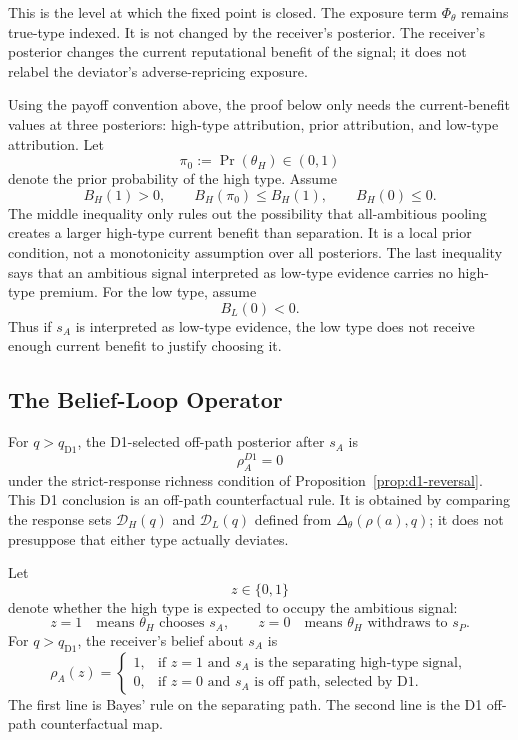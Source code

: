 This is the level at which the fixed point is closed. The exposure term \(\Phi_\theta\) remains true-type indexed. It is not changed by the receiver's posterior. The receiver's posterior changes the current reputational benefit of the signal; it does not relabel the deviator's adverse-repricing exposure.

Using the payoff convention above, the proof below only needs the current-benefit values at three posteriors: high-type attribution, prior attribution, and low-type attribution.
Let
\[
\pi_0:=\Pr(\theta_H)\in(0,1)
\]
denote the prior probability of the high type. Assume
\[
B_H(1)>0,
\qquad
B_H(\pi_0)\le B_H(1),
\qquad
B_H(0)\le 0.
\]
The middle inequality only rules out the possibility that all-ambitious pooling creates a larger high-type current benefit than separation. It is a local prior condition, not a monotonicity assumption over all posteriors. The last inequality says that an ambitious signal interpreted as low-type evidence carries no high-type premium. For the low type, assume
\[
B_L(0)<0.
\]
Thus if \(s_A\) is interpreted as low-type evidence, the low type does not receive enough current benefit to justify choosing it.

\subsection{The Belief-Loop Operator}
\label{subsec:belief-loop-operator}

For \(q>q_{\mathrm{D1}}\), the D1-selected off-path posterior after \(s_A\) is
\[
\rho_A^{D1}=0
\]
under the strict-response richness condition of Proposition~\ref{prop:d1-reversal}. This D1 conclusion is an off-path counterfactual rule. It is obtained by comparing the response sets \(\mathcal D_H(q)\) and \(\mathcal D_L(q)\) defined from \(\Delta_\theta(\rho(a),q)\); it does not presuppose that either type actually deviates.

Let
\[
z\in\{0,1\}
\]
denote whether the high type is expected to occupy the ambitious signal:
\[
z=1 \quad\text{means } \theta_H \text{ chooses }s_A,
\qquad
z=0 \quad\text{means } \theta_H \text{ withdraws to }s_P.
\]
For \(q>q_{\mathrm{D1}}\), the receiver's belief about \(s_A\) is
\[
\rho_A(z)=
\begin{cases}
1, & \text{if }z=1\text{ and }s_A\text{ is the separating high-type signal},\\
0, & \text{if }z=0\text{ and }s_A\text{ is off path, selected by D1}.
\end{cases}
\]
The first line is Bayes' rule on the separating path. The second line is the D1 off-path counterfactual map.

